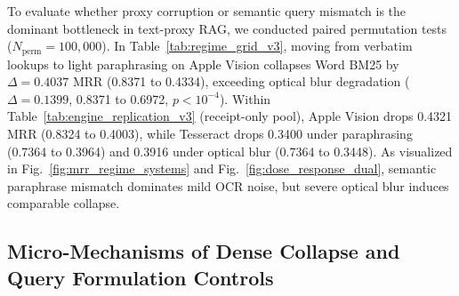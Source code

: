 To evaluate whether proxy corruption or semantic query mismatch is the dominant bottleneck in text-proxy RAG, we conducted paired permutation tests ($N_{\text{perm}}=100{,}000$). In Table~\ref{tab:regime_grid_v3}, moving from verbatim lookups to light paraphrasing on Apple Vision collapses Word BM25 by $\Delta = 0.4037$ MRR (0.8371 to 0.4334), exceeding optical blur degradation ($\Delta = 0.1399$, 0.8371 to 0.6972, $p < 10^{-4}$). Within Table~\ref{tab:engine_replication_v3} (receipt-only pool), Apple Vision drops 0.4321 MRR (0.8324 to 0.4003), while Tesseract drops 0.3400 under paraphrasing (0.7364 to 0.3964) and 0.3916 under optical blur (0.7364 to 0.3448). As visualized in Fig.~\ref{fig:mrr_regime_systems} and Fig.~\ref{fig:dose_response_dual}, semantic paraphrase mismatch dominates mild OCR noise, but severe optical blur induces comparable collapse.

\subsection{Micro-Mechanisms of Dense Collapse and Query Formulation Controls}
\label{sec:mechanism_analysis}

